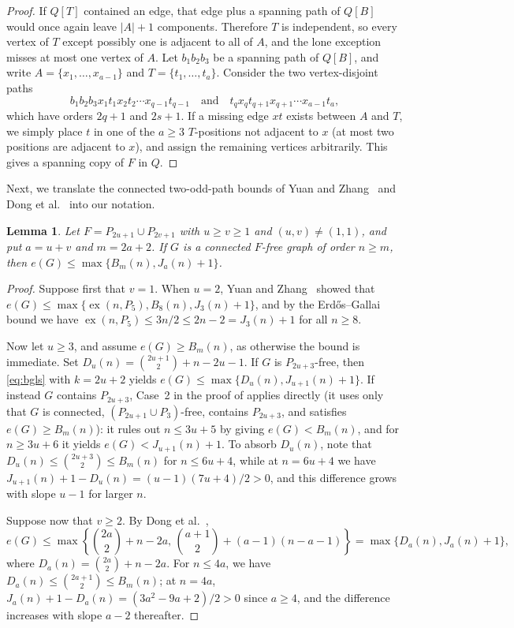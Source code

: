 \documentclass[10pt]{article}
\theoremstyle{compactplain}
\newtheorem{lemma}[theorem]{Lemma}
\theoremstyle{remark}\newtheorem{remark}[theorem]{Remark}
\newcommand{\ex}{\operatorname{ex}}
\begin{document}
\begin{proof}
If $Q[T]$ contained an edge, that edge plus a spanning path of $Q[B]$
would once again leave $|A|+1$ components. Therefore $T$ is independent,
so every vertex of $T$ except possibly one is adjacent to all of $A$,
and the lone exception misses at most one vertex of $A$. Let $b_1b_2b_3$
be a spanning path of $Q[B]$, and write $A=\{x_1,\ldots,x_{a-1}\}$ and
$T=\{t_1,\ldots,t_a\}$. Consider the two vertex-disjoint paths
\[
 b_1b_2b_3x_1t_1x_2t_2\cdots x_{q-1}t_{q-1}
 \quad\text{and}\quad
 t_q x_q t_{q+1} x_{q+1}\cdots x_{a-1}t_a,
\]
which have orders $2q+1$ and $2s+1$. If a missing edge $xt$ exists
between $A$ and $T$, we simply place $t$ in one of the $a\ge3$
$T$-positions not adjacent to $x$ (at most two positions are adjacent to
$x$), and assign the remaining vertices arbitrarily. This gives a
spanning copy of $F$ in $Q$.
\end{proof}

Next, we translate the connected two-odd-path bounds of Yuan and
Zhang~\cite{YZ} and Dong et al.~\cite{DNYZ} into our notation.

\begin{lemma}\label{lem:two-odd}
Let $F=P_{2u+1}\cup P_{2v+1}$ with $u\ge v\ge1$ and $(u,v)\ne(1,1)$, and
put $a=u+v$ and $m=2a+2$. If $G$ is a connected $F$-free graph of order
$n\ge m$, then $e(G)\le\max\{B_m(n),J_a(n)+1\}$.
\end{lemma}
\begin{proof}
Suppose first that $v=1$. When $u=2$, Yuan and
Zhang~\cite[Theorem~1.8]{YZ} showed that
$e(G)\le\max\{\ex(n,P_5),B_8(n),J_3(n)+1\}$, and by the Erd\H{o}s--Gallai
bound we have $\ex(n,P_5)\le3n/2\le2n-2=J_3(n)+1$ for all $n\ge8$.

Now let $u\ge3$, and assume $e(G)\ge B_m(n)$, as otherwise the bound is
immediate. Set $D_u(n)=\binom{2u+1}{2}+n-2u-1$. If $G$ is
$P_{2u+3}$-free, then \eqref{eq:bgls} with $k=2u+2$ yields
$e(G)\le\max\{D_u(n),J_{u+1}(n)+1\}$. If instead $G$ contains
$P_{2u+3}$, Case~2 in the proof of \cite[Theorem~1.8]{YZ} applies
directly (it uses only that $G$ is connected, $(P_{2u+1}\cup P_3)$-free,
contains $P_{2u+3}$, and satisfies $e(G)\ge B_m(n)$): it rules out
$n\le3u+5$ by giving $e(G)<B_m(n)$, and for $n\ge3u+6$ it yields
$e(G)<J_{u+1}(n)+1$. To absorb $D_u(n)$, note that
$D_u(n)\le\binom{2u+3}{2}\le B_m(n)$ for $n\le6u+4$, while at $n=6u+4$
we have $J_{u+1}(n)+1-D_u(n)=(u-1)(7u+4)/2>0$, and this difference grows
with slope $u-1$ for larger $n$.

Suppose now that $v\ge2$. By Dong et al.~\cite[Theorem~4.1]{DNYZ},
\[
 e(G)\le\max\left\{\binom{2a}{2}+n-2a,\,
 \binom{a+1}{2}+(a-1)(n-a-1)\right\}
 =\max\{D_a(n),J_a(n)+1\},
\]
where $D_a(n)=\binom{2a}{2}+n-2a$. For $n\le4a$, we have
$D_a(n)\le\binom{2a+1}{2}\le B_m(n)$; at $n=4a$,
$J_a(n)+1-D_a(n)=(3a^2-9a+2)/2>0$ since $a\ge4$, and the difference
increases with slope $a-2$ thereafter.
\end{proof}
\end{document}
